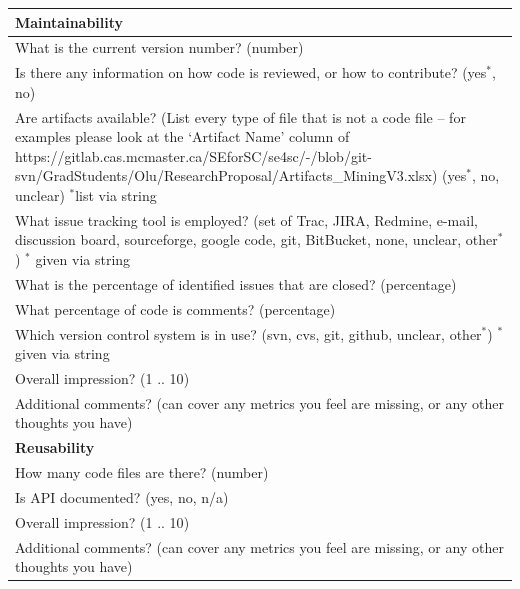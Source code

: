 \documentclass[letterpaper,cleveref]{lipics-v2019}
\begin{document}
\def\arraystretch{1.4}
\begin{tabular}{p{14cm}}
		\hline	
	\textbf{Maintainability}\\
	\hline
	What is the current version number? (number)\\
	Is there any information on how code is reviewed, or how to contribute?
	({yes$^*$, no})\\
	Are artifacts available? (List every type of file that is not a code file –
	for examples please look at the ‘Artifact Name’ column of
	https://gitlab.cas.mcmaster.ca/SEforSC/se4sc/-/blob/git-svn/GradStudents/Olu/ResearchProposal/Artifacts\_MiningV3.xlsx)
	({yes$^*$, no, unclear}) $^*$list via string\\
	What issue tracking tool is employed? (set of {Trac, JIRA, Redmine, e-mail,
	discussion board, sourceforge, google code, git, BitBucket, none, unclear,
	other$^*$}) $^*$ given via string\\
	What is the percentage of identified issues that are closed? (percentage)\\
	What percentage of code is comments? (percentage)\\
	Which version control system is in use? ({svn, cvs, git, github, unclear,
	other$^*$}) $^*$ given via string\\
	Overall impression? ({1 .. 10})\\
	Additional comments? (can cover any metrics you feel are missing, or any other
	thoughts you have)\\
	\hline		
	\textbf{Reusability}\\
	\hline
	How many code files are there? (number)\\
	Is API documented? ({yes, no, n/a})\\
	Overall impression? ({1 .. 10})\\
	Additional comments? (can cover any metrics you feel are missing, or any other
	thoughts you have)\\
	\hline		
\end{tabular}
\end{document}
